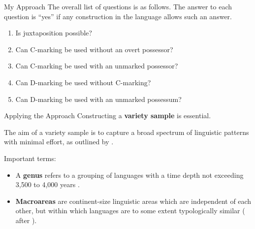 \documentclass[12pt,aspectratio=169,t]{beamer}
\renewcommand{\'}{\textquotesingle}
\begin{document}
\begin{frame}{My Approach}
	The overall list of questions is as follows. The answer to each question is ``yes'' if any construction in the language allows such an answer.
	
	\begin{enumerate}
		\item Is juxtaposition possible?
		\item Can C-marking be used without an overt possessor?
		\item Can C-marking be used with an unmarked possessor?
		\item Can D-marking be used without C-marking?
		\item Can D-marking be used with an unmarked possessum?
	\end{enumerate}
\end{frame}

\begin{frame}{Applying the Approach}
	Constructing a \textbf{variety sample} is essential.
	
	\pause
	The aim of a variety sample is to capture a broad spectrum of linguistic patterns with minimal effort, as outlined by \cite{miestamo2016sampling}.
	
	\pause
	
	Important terms:
	
	\vspace{-0.7em}
	\begin{itemize}
		\item A \textbf{genus} refers to a grouping of languages with a time depth not exceeding 3,500 to 4,000 years \citep{dryer1989large}.
		\item \textbf{Macroareas} are continent-size linguistic areas
		which are independent of each other, but within which languages are to some
		extent typologically similar (\citealt{miestamo2016sampling} after \citealt{dryer1989large}).
	\end{itemize}
\end{frame}
\end{document}
